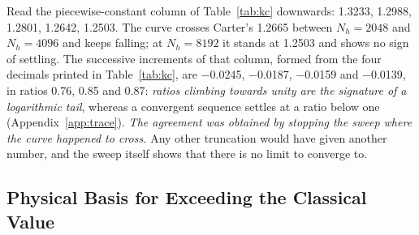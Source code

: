 \documentclass[10pt,a4paper,twocolumn]{article}
\theoremstyle{plain}
\theoremstyle{remark}
\begin{document}
Read the piecewise-constant column of Table~\ref{tab:kc} downwards:
\num{1.3233}, \num{1.2988}, \num{1.2801}, \num{1.2642}, \num{1.2503}.
The curve crosses Carter's \num{1.2665} between $N_h=\num{2048}$ and
$N_h=\num{4096}$ and keeps falling; at $N_h=\num{8192}$ it stands at
\num{1.2503} and shows no sign of settling. The successive increments of
that column, formed from the four decimals printed in
Table~\ref{tab:kc}, are \num{-0.0245}, \num{-0.0187}, \num{-0.0159} and
\num{-0.0139}, in ratios \num{0.76}, \num{0.85} and \num{0.87}:
\emph{ratios climbing towards unity are the signature of a logarithmic
tail}, whereas a convergent sequence settles at a ratio below one
(Appendix~\ref{app:trace}). \emph{The agreement was obtained by stopping the
sweep where the curve happened to cross.} Any other truncation would
have given another number, and the sweep itself shows that there is no
limit to converge to.

\subsection{Physical Basis for Exceeding the Classical Value}
\label{sub:priorwork}
\end{document}
